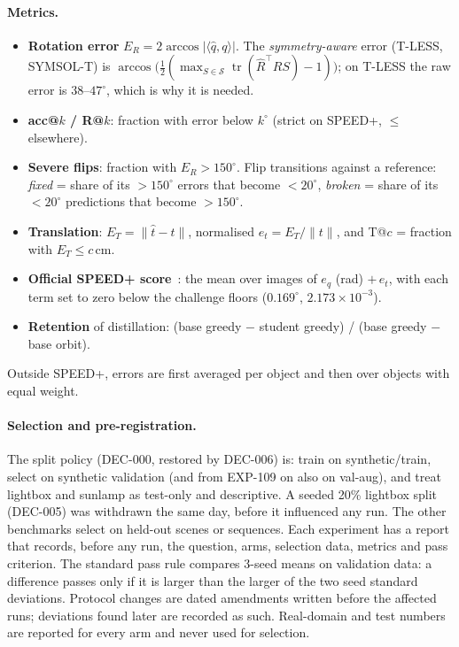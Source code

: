 \paragraph{Metrics.}
\begin{itemize}
  \item \textbf{Rotation error} $E_R=2\arccos|\langle\hat q,q\rangle|$. The \emph{symmetry-aware} error (T-LESS, SYMSOL-T) is $\arccos\big(\tfrac12(\max_{S\in\mathcal{S}}\operatorname{tr}(\hat R^\top RS)-1)\big)$; on T-LESS the raw error is $38$--$47^\circ$, which is why it is needed.
  \item \textbf{acc@$k$ / R@$k$}: fraction with error below $k^\circ$ (strict on SPEED+, $\le$ elsewhere).
  \item \textbf{Severe flips}: fraction with $E_R>150^\circ$. Flip transitions against a reference: \emph{fixed} = share of its $>150^\circ$ errors that become $<20^\circ$, \emph{broken} = share of its $<20^\circ$ predictions that become $>150^\circ$.
  \item \textbf{Translation}: $E_T=\|\hat t-t\|$, normalised $e_t=E_T/\|t\|$, and T@$c$ = fraction with $E_T\le c$\,cm.
  \item \textbf{Official SPEED+ score}~\cite{park2022speedplus,park2024spnv2}: the mean over images of $e_q$ (rad) $+\,e_t$, with each term set to zero below the challenge floors ($0.169^\circ$, $2.173\times10^{-3}$).
  \item \textbf{Retention} of distillation: (base greedy $-$ student greedy) / (base greedy $-$ base orbit).
\end{itemize}
Outside SPEED+, errors are first averaged per object and then over objects with equal weight.

\paragraph{Selection and pre-registration.}
The split policy (DEC-000, restored by DEC-006) is: train on synthetic/train, select on synthetic validation (and from EXP-109 on also on val-aug), and treat lightbox and sunlamp as test-only and descriptive. A seeded 20\% lightbox split (DEC-005) was withdrawn the same day, before it influenced any run. The other benchmarks select on held-out scenes or sequences. Each experiment has a report that records, before any run, the question, arms, selection data, metrics and pass criterion. The standard pass rule compares 3-seed means on validation data: a difference passes only if it is larger than the larger of the two seed standard deviations. Protocol changes are dated amendments written before the affected runs; deviations found later are recorded as such. Real-domain and test numbers are reported for every arm and never used for selection.

